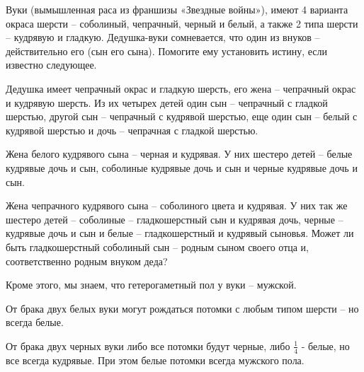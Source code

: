 
Вуки (вымышленная раса из франшизы «Звездные войны»), имеют 4 варианта окраса шерсти – соболиный, чепрачный, черный и белый, а также 
2 типа шерсти – кудрявую и гладкую. Дедушка-вуки сомневается, что один из внуков – действительно его (сын его сына). Помогите ему 
установить истину, если известно следующее.

Дедушка имеет чепрачный окрас и гладкую шерсть, его жена – чепрачный окрас и кудрявую шерсть. Из их 
четырех детей один сын – чепрачный с гладкой шерстью, другой сын – чепрачный с кудрявой шерстью, еще один сын – белый с 
кудрявой шерстью и дочь – чепрачная с гладкой шерстью.

Жена белого кудрявого сына – черная и кудрявая.  У них шестеро детей – белые кудрявые дочь и сын, 
соболиные кудрявые дочь и сын и черные кудрявые дочь и сын.

Жена чепрачного кудрявого сына – соболиного цвета и кудрявая. У них так же шестеро детей – соболиные – 
гладкошерстный сын и кудрявая дочь, черные – кудрявые дочь и сын и белые – гладкошерстный и кудрявый сыновья. 
Может ли быть гладкошерстный соболиный сын – родным сыном своего отца и, соответственно родным внуком деда?

Кроме этого, мы знаем, что гетерогаметный пол у вуки – мужской.

От брака двух белых вуки могут рождаться потомки с любым типом шерсти – но всегда белые.

От брака двух черных вуки либо все потомки будут черные, либо $\frac{1}{4}$ - белые, но все всегда кудрявые. При этом белые потомки всегда мужского пола. 
